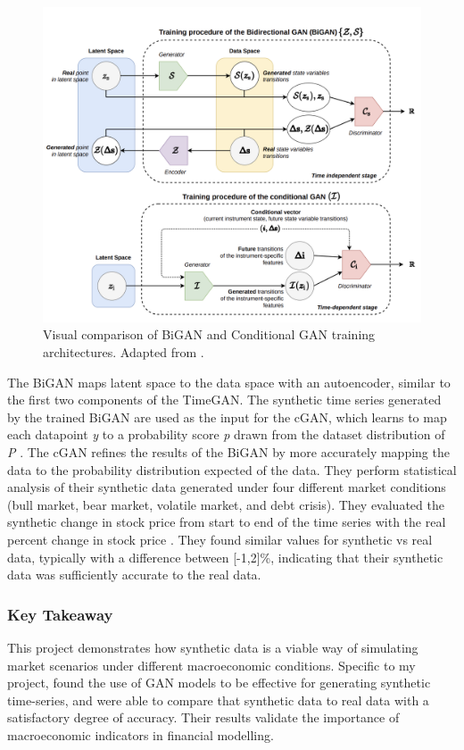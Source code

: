 \documentclass[10pt,twocolumn]{article}
\begin{document}
\begin{figure}[h]
    \centering
    \includegraphics[width=\columnwidth]{bigan_vs_cgan.png}
    \caption{Visual comparison of BiGAN and Conditional GAN training architectures. Adapted from \textcite{rizzato2023generativeadversarial}.}
    \label{fig:bigan-vs-cgan}
\end{figure}

The BiGAN maps latent space to the data space with an autoencoder, similar to the first two components of the TimeGAN. The synthetic time series generated by the trained BiGAN are used as the input for the cGAN, which learns to map each datapoint \textit{y} to a probability score \textit{p} drawn from the dataset distribution of \textit{P} \cite{rizzato2023generativeadversarial}. The cGAN refines the results of the BiGAN by more accurately mapping the data to the probability distribution expected of the data. They perform statistical analysis of their synthetic data generated under four different market conditions (bull market, bear market, volatile market, and debt crisis). They evaluated the synthetic change in stock price from start to end of the time series with the real percent change in stock price \cite{rizzato2023generativeadversarial}. They found similar values for synthetic vs real data, typically with a difference between [-1,2]\%, indicating that their synthetic data was sufficiently accurate to the real data.

\subsubsection{Key Takeaway}
This project demonstrates how synthetic data is a viable way of simulating market scenarios under different macroeconomic conditions. Specific to my project, \textcite{rizzato2023generativeadversarial} found the use of GAN models to be effective for generating synthetic time-series, and were able to compare that synthetic data to real data with a satisfactory degree of accuracy. Their results validate the importance of macroeconomic indicators in financial modelling.
\end{document}
